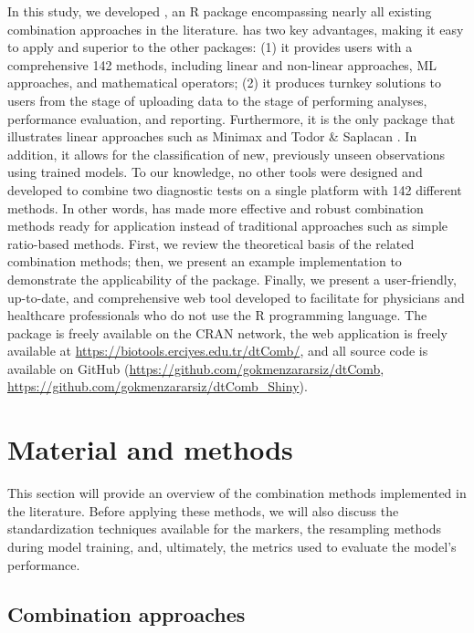 In this study, we developed , an R package encompassing nearly all existing combination approaches in the literature.  has two key advantages, making it easy to apply and superior to the other packages: (1) it provides users with a comprehensive 142 methods, including linear and non-linear approaches, ML approaches, and mathematical operators; (2) it produces turnkey solutions to users from the stage of uploading data to the stage of performing analyses, performance evaluation, and reporting. Furthermore, it is the only package that illustrates linear approaches such as Minimax and Todor \& Saplacan \citep{sameera2016binary, todor2014tools}. In addition, it allows for the classification of new, previously unseen observations using trained models. To our knowledge, no other tools were designed and developed to combine two diagnostic tests on a single platform with 142 different methods. In other words,  has made more effective and robust combination methods ready for application instead of traditional approaches such as simple ratio-based methods. First, we review the theoretical basis of the related combination methods; then, we present an example implementation to demonstrate the applicability of the package. Finally, we present a user-friendly, up-to-date, and comprehensive web tool developed to facilitate  for physicians and healthcare professionals who do not use the R programming language. The  package is freely available on the CRAN network, the web application is freely available at \url{https://biotools.erciyes.edu.tr/dtComb/}, and all source code is available on GitHub (\url{https://github.com/gokmenzararsiz/dtComb}, \url{https://github.com/gokmenzararsiz/dtComb_Shiny}).

\section{Material and methods}\label{material-and-methods}

This section will provide an overview of the combination methods implemented in the literature. Before applying these methods, we will also discuss the standardization techniques available for the markers, the resampling methods during model training, and, ultimately, the metrics used to evaluate the model's performance.

\subsection{Combination approaches}\label{combination-approaches}

